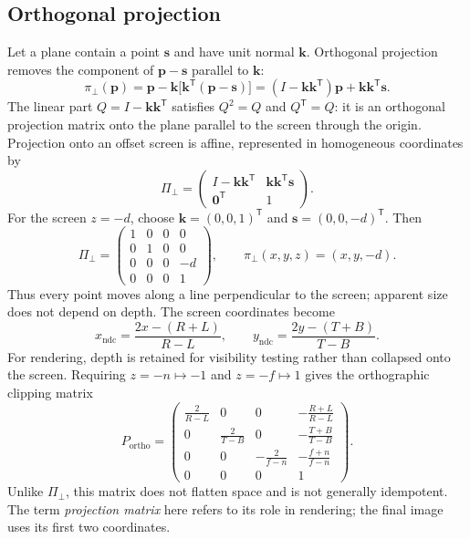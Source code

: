\documentclass[11pt,a4paper]{article}
\newcommand{\vect}[1]{\boldsymbol{#1}}
\newcommand{\ndc}{\mathrm{ndc}}
\numberwithin{equation}{section}
\begin{document}
\subsection{Orthogonal projection}
Let a plane contain a point $\vect s$ and have unit normal $\vect k$. Orthogonal projection removes the component of $\vect p-\vect s$ parallel to $\vect k$:
\begin{equation}
\pi_{\perp}(\vect p)=\vect p-\vect k\bigl[\vect k^{\mathsf T}(\vect p-\vect s)\bigr]
=(I-\vect k\vect k^{\mathsf T})\vect p+\vect k\vect k^{\mathsf T}\vect s.
\end{equation}
The linear part $Q=I-\vect k\vect k^{\mathsf T}$ satisfies $Q^2=Q$ and $Q^{\mathsf T}=Q$: it is an orthogonal projection matrix onto the plane parallel to the screen through the origin. Projection onto an offset screen is affine, represented in homogeneous coordinates by
\begin{equation}
\Pi_{\perp}=\begin{pmatrix}I-\vect k\vect k^{\mathsf T}&\vect k\vect k^{\mathsf T}\vect s\\\vect 0^{\mathsf T}&1\end{pmatrix}.
\end{equation}
For the screen $z=-d$, choose $\vect k=(0,0,1)^{\mathsf T}$ and $\vect s=(0,0,-d)^{\mathsf T}$. Then
\begin{equation}
\Pi_{\perp}=\begin{pmatrix}1&0&0&0\\0&1&0&0\\0&0&0&-d\\0&0&0&1\end{pmatrix},
\qquad \pi_{\perp}(x,y,z)=(x,y,-d).
\end{equation}
Thus every point moves along a line perpendicular to the screen; apparent size does not depend on depth. The screen coordinates become
\begin{equation}
x_{\ndc}=\frac{2x-(R+L)}{R-L},\qquad
y_{\ndc}=\frac{2y-(T+B)}{T-B}.
\end{equation}
For rendering, depth is retained for visibility testing rather than collapsed onto the screen. Requiring $z=-n\mapsto-1$ and $z=-f\mapsto1$ gives the orthographic clipping matrix
\begin{equation}
P_{\mathrm{ortho}}=\begin{pmatrix}
\frac{2}{R-L}&0&0&-\frac{R+L}{R-L}\\
0&\frac{2}{T-B}&0&-\frac{T+B}{T-B}\\
0&0&-\frac{2}{f-n}&-\frac{f+n}{f-n}\\
0&0&0&1
\end{pmatrix}.
\end{equation}
Unlike $\Pi_{\perp}$, this matrix does not flatten space and is not generally idempotent. The term \emph{projection matrix} here refers to its role in rendering; the final image uses its first two coordinates.
\end{document}
